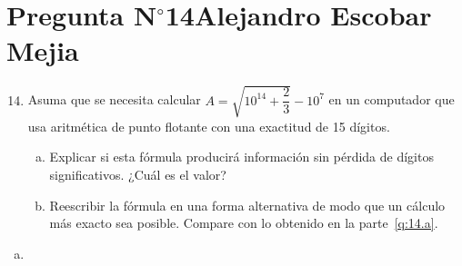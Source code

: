 \section{Pregunta N$^{\circ}$14\qquad Alejandro Escobar Mejia}

\begin{frame}
	\begin{enumerate}\setcounter{enumi}{13}
		\item

		      Asuma que se necesita calcular
		      \begin{math}
			      A=
			      \sqrt{10^{14}+\dfrac{2}{3}}-10^{7}
		      \end{math}
		      en un computador que usa aritmética de punto flotante con
		      una exactitud de 15 dígitos.

		      \begin{enumerate}[a)]
			      \item\label{q:14.a}

			      Explicar si esta fórmula producirá información sin
			      pérdida de dígitos significativos.
			      ¿Cuál es el valor?

			      \item\label{q:14.b}

			      Reescribir la fórmula en una forma alternativa de
			      modo que un cálculo más exacto sea posible.
			      Compare con lo obtenido en la parte~\eqref{q:14.a}.
		      \end{enumerate}
	\end{enumerate}

	\begin{solution}
		\begin{enumerate}[a)]
			\item



\end{enumerate}
\end{solution}
\end{frame}
